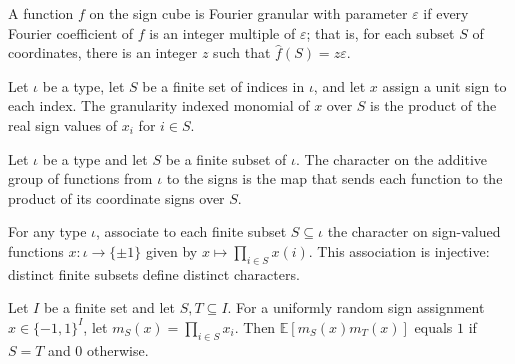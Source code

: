 \begin{definition}
\label{FABL.IsFourierGranular}
\leanok
{}
A function $f$ on the sign cube is Fourier granular with parameter $\varepsilon$ if
every Fourier coefficient of $f$ is an integer multiple of $\varepsilon$; that is, for
each subset $S$ of coordinates, there is an integer $z$ such that $\widehat
f(S)=z\varepsilon$.
\end{definition}

\begin{definition}
\label{FABL.granularityIndexedMonomial}
\leanok
{}
Let $\iota$ be a type, let $S$ be a finite set of indices in $\iota$, and let $x$ assign
a unit sign to each index. The granularity indexed monomial of $x$ over $S$ is the
product of the real sign values of $x_i$ for $i\in S$.
\end{definition}

\begin{definition}
\label{FABL.granularitySignMonomialChar}
\leanok
{}
Let $\iota$ be a type and let $S$ be a finite subset of $\iota$. The character on the
additive group of functions from $\iota$ to the signs is the map that sends each
function to the product of its coordinate signs over $S$.
\end{definition}

\begin{theorem}
\label{FABL.granularitySignMonomialChar_injective}
\leanok
{}
For any type $\iota$, associate to each finite subset $S\subseteq\iota$ the character on
sign-valued functions $x:\iota\to\{\pm1\}$ given by $x\mapsto\prod_{i\in S}x(i)$. This
association is injective: distinct finite subsets define distinct characters.
\end{theorem}

\begin{theorem}
\label{FABL.expect_granularityIndexedMonomial_mul}
\leanok
{}
Let $I$ be a finite set and let $S,T\subseteq I$. For a uniformly random sign
assignment $x\in\{-1,1\}^I$, let $m_S(x)=\prod_{i\in S}x_i$. Then $\mathbb
E[m_S(x)m_T(x)]$ equals $1$ if $S=T$ and $0$ otherwise.
\end{theorem}

